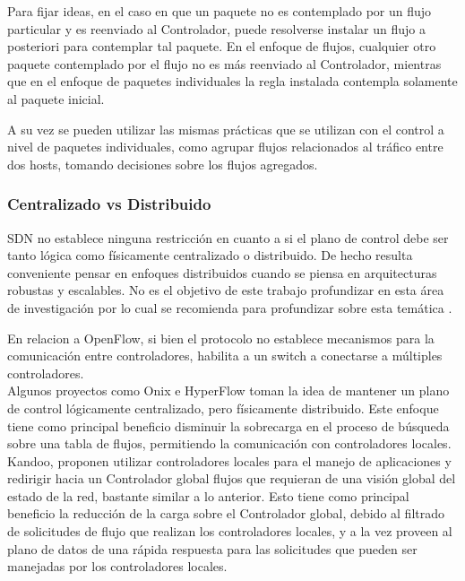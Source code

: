 Para fijar ideas, en el caso en que un paquete no es contemplado por un flujo particular y es reenviado al Controlador, puede resolverse instalar un flujo a posteriori para contemplar tal paquete. En el enfoque de flujos, cualquier otro paquete contemplado por el flujo no es m\'as reenviado al Controlador, mientras que en el enfoque de paquetes individuales la regla instalada contempla solamente al paquete inicial.

A su vez se pueden utilizar las mismas prácticas que se utilizan con el control a nivel
de paquetes individuales, como agrupar flujos relacionados al tráfico entre dos hosts, tomando
decisiones sobre los flujos agregados. 

\subsubsection{Centralizado vs Distribuido}
SDN no establece ninguna restricción en cuanto a si el plano de control debe ser tanto lógica como físicamente centralizado o distribuido. De hecho resulta conveniente pensar en enfoques distribuidos cuando se piensa en arquitecturas robustas y escalables. No es el objetivo de este trabajo profundizar en esta área de investigación por lo cual se recomienda para profundizar sobre esta temática \cite{heller2012controller}\cite{levin2012logically}. 

En relacion a OpenFlow, si bien el protocolo no establece mecanismos para la comunicación entre controladores, habilita a un switch a conectarse a múltiples controladores.\\

Algunos proyectos como Onix\cite{koponen2014distributed} e HyperFlow\cite{tootoonchian2010hyperflow} toman la idea de mantener un plano de control lógicamente centralizado, pero físicamente distribuido. Este enfoque tiene como principal beneficio disminuir la sobrecarga en el proceso de búsqueda sobre una tabla de flujos, permitiendo la comunicación con controladores locales.\\

Kandoo\cite{hassas2012kandoo}, proponen utilizar controladores locales para el manejo de aplicaciones y redirigir hacia un Controlador global flujos que requieran de una visión global del estado de la red, bastante similar a lo anterior. Esto tiene como principal beneficio la reducción de la carga sobre el Controlador global, debido al filtrado de solicitudes de flujo que realizan los controladores locales, y a la vez proveen al plano de datos de una rápida respuesta para las solicitudes que pueden ser manejadas por los controladores locales.\\

